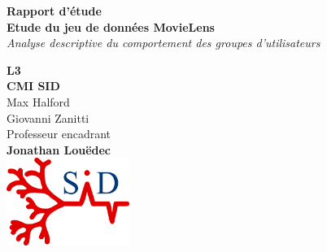 \begin{titlepage}

\begin{center}

\textup{\small {\bf Rapport d'étude}}\\[0.2in]

\Large \textbf {Etude du jeu de données MovieLens}\\[0.5in]

       \small \emph{Analyse descriptive du comportement des groupes d'utilisateurs}
        \vspace{.2in}

       {\bf L3 \\ CMI SID}\\
      
\vspace{.2in}
\centering
Max Halford \\
Giovanni Zanitti \\
 
\vspace{.2in}
Professeur encadrant\\
{\textbf{Jonathan Louëdec}}\\[0.2in]

\vspace{.2in}
\includegraphics[width=0.30\textwidth]{./images/logoSID.png}\\[0.1in]

\end{center}

\end{titlepage}
